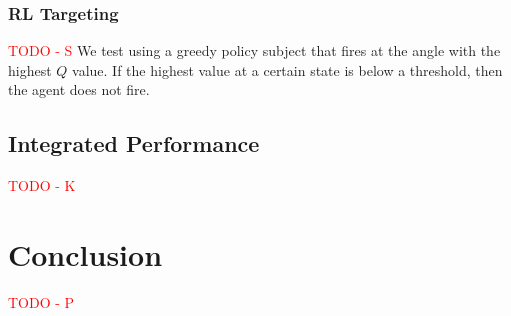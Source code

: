 \documentclass{article}
\newcommand{\xxx}[1]{\textcolor{red}{#1}}
\theoremstyle{plain}
\theoremstyle{definition}
\theoremstyle{remark}
\begin{document}
\subsubsection*{RL Targeting}
\xxx{TODO - S}
We test using a greedy policy subject that fires at the angle with the highest $Q$ value. If the highest value at a certain state is below a threshold, then
the agent does not fire.


\subsection*{Integrated Performance}
\xxx{TODO - K}

\section{Conclusion}

\xxx{TODO - P}




\end{document}
